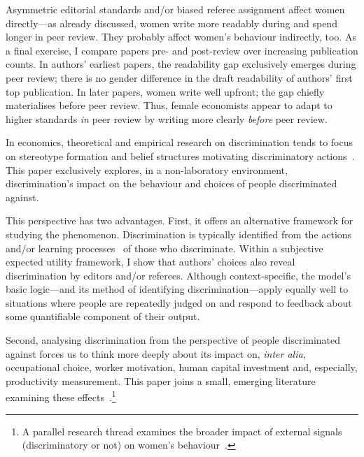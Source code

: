Asymmetric editorial standards and\slash or biased referee assignment affect women directly---as already discussed, women write more readably during and spend longer in peer review. They probably affect women's behaviour indirectly, too. As a final exercise, I compare papers pre- and post-review over increasing publication counts. In authors' earliest papers, the readability gap exclusively emerges during peer review; there is no gender difference in the draft readability of authors' first top publication. In later papers, women write well upfront; the gap chiefly materialises before peer review. Thus, female economists appear to adapt to higher standards \emph{in} peer review by writing more clearly \emph{before} peer review.

\vspace*{\baselineskip}

In economics, theoretical and empirical research on discrimination tends to focus on stereotype formation and belief structures motivating discriminatory actions~\citep[\emph{e.g.},][]{Becker1957,Phelps1972,Arrow1973,Coate1993,Bordalo2016}. This paper exclusively explores, in a non-laboratory environment, discrimination's impact on the behaviour and choices of people discriminated against.

This perspective has two advantages. First, it offers an alternative framework for studying the phenomenon. Discrimination is typically identified from the actions~\citep[\emph{e.g.},][]{Neumark1970,Bertrand2004} and\slash or learning processes~\citep[\emph{e.g.},][]{Altonji2001,Fryer2013} of those who discriminate. Within a subjective expected utility framework, I show that authors' choices also reveal discrimination by editors and\slash or referees. Although context-specific, the model's basic logic---and its method of identifying discrimination---apply equally well to situations where people are repeatedly judged on and respond to feedback about some quantifiable component of their output.

Second, analysing discrimination from the perspective of people discriminated against forces us to think more deeply about its impact on, \emph{inter alia}, occupational choice, worker motivation, human capital investment and, especially, productivity measurement. This paper joins a small, emerging literature examining these effects~\citep[\emph{e.g.},][]{Parsons2011,Craig2017,Glover2017,Lavy2015}.\footnote{A parallel research thread examines the broader impact of external signals (discriminatory or not) on women's behaviour~\citep{Kugler2017}.}

